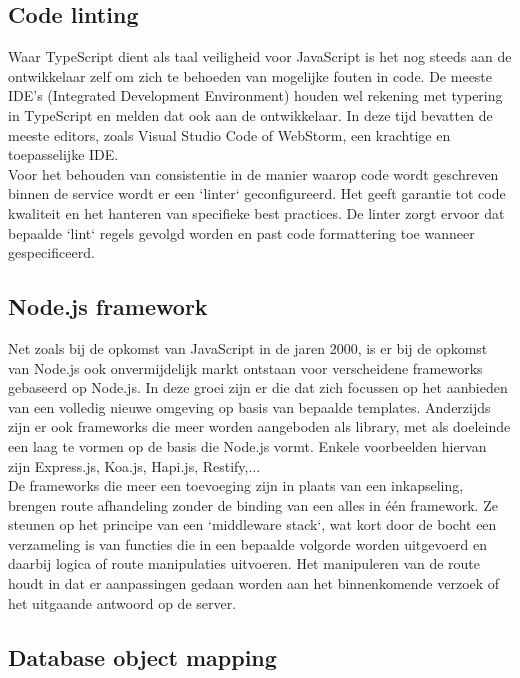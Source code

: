 \subsection{Code linting}

Waar TypeScript dient als taal veiligheid voor JavaScript is het nog steeds aan de ontwikkelaar zelf om zich te behoeden van mogelijke fouten in code. De meeste IDE's (Integrated Development Environment) houden wel rekening met typering in TypeScript en melden dat ook aan de ontwikkelaar. In deze tijd bevatten de meeste editors, zoals Visual Studio Code of WebStorm, een krachtige en toepasselijke IDE. \\ 
Voor het behouden van consistentie in de manier waarop code wordt geschreven binnen de service wordt er een `linter` geconfigureerd. Het geeft garantie tot code kwaliteit en het hanteren van specifieke best practices. De linter zorgt ervoor dat bepaalde `lint` regels gevolgd worden en past code formattering toe wanneer gespecificeerd.

\subsection{Node.js framework}

Net zoals bij de opkomst van JavaScript in de jaren 2000, is er bij de opkomst van Node.js ook onvermijdelijk markt ontstaan voor verscheidene frameworks gebaseerd op Node.js. In deze groei zijn er die dat zich focussen op het aanbieden van een volledig nieuwe omgeving op basis van bepaalde templates. Anderzijds zijn er ook frameworks die meer worden aangeboden als library, met als doeleinde een laag te vormen op de basis die Node.js vormt. Enkele voorbeelden hiervan zijn Express.js, Koa.js, Hapi.js, Restify,... \\
De frameworks die meer een toevoeging zijn in plaats van een inkapseling, brengen route afhandeling zonder de binding van een alles in één framework. Ze steunen op het principe van een `middleware stack`, wat kort door de bocht een verzameling is van functies die in een bepaalde volgorde worden uitgevoerd en daarbij logica of route manipulaties uitvoeren. Het manipuleren van de route houdt in dat er aanpassingen gedaan worden aan het binnenkomende verzoek of het uitgaande antwoord op de server.

\subsection{Database object mapping}

